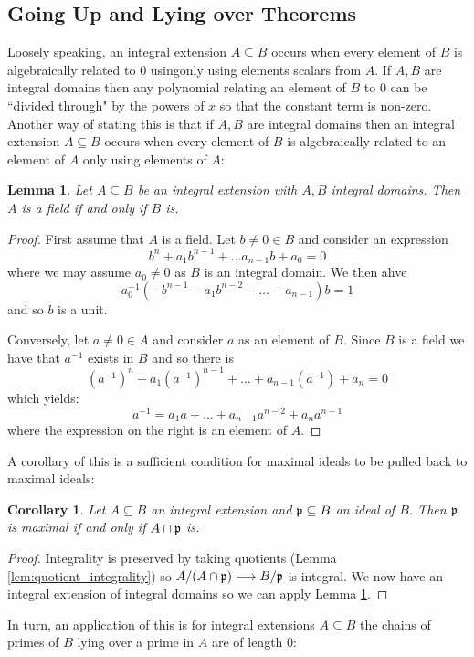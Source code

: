 \documentclass[12pt]{article}
\theoremstyle{plain}
\newtheorem{lemma}[thm]{Lemma}
\newtheorem{cor}[thm]{Corollary}
\theoremstyle{definition}
\newcommand{\lto}{\longrightarrow}
\begin{document}
	\subsection{Going Up and Lying over Theorems}
	Loosely speaking, an integral extension $A \subseteq B$ occurs when every element of $B$ is algebraically related to $0$ usingonly using elements scalars from $A$. If $A,B$ are integral domains then any polynomial relating an element of $B$ to $0$ can be ``divided through" by the powers of $x$ so that the constant term is non-zero. Another way of stating this is that if $A,B$ are integral domains then an integral extension $A \subseteq B$ occurs when every element of $B$ is algebraically related to an element of $A$ only using elements of $A$:
	\begin{lemma}
		\label{lem:integral_ext_fields}
		Let $A \subseteq B$ be an integral extension with $A,B$ integral domains. Then $A$ is a field if and only if $B$ is.
	\end{lemma}
	\begin{proof}
		First assume that $A$ is a field. Let $b \neq 0 \in B$ and consider an expression
		\[b^n + a_1b^{n-1} + \hdots a_{n-1}b + a_0 = 0\]
		where we may assume $a_0 \neq 0$ as $B$ is an integral domain. We then ahve
		\[a_0^{-1}(-b^{n-1} - a_1b^{n-2} - \hdots - a_{n-1})b = 1\]
		and so $b$ is a unit.
		
		Conversely, let $a \neq 0\in A$ and consider $a$ as an element of $B$. Since $B$ is a field we have that $a^{-1}$ exists in $B$ and so there is
		\[(a^{-1})^n + a_{1}(a^{-1})^{n-1} + \hdots + a_{n-1}(a^{-1}) + a_n = 0\]
		which yields:
		\[a^{-1} = a_1a + \hdots + a_{n-1}a^{n-2} + a_na^{n-1}\]
		where the expression on the right is an element of $A$.
	\end{proof}
	A corollary of this is a sufficient condition for maximal ideals to be pulled back to maximal ideals:
	\begin{cor}
		\label{cor:maximality_preserved_integrality}
		Let $A \subseteq B$ an integral extension and $\frak{p} \subseteq B$ an ideal of $B$. Then $\frak{p}$ is maximal if and only if $A \cap \frak{p}$ is.
	\end{cor}
	\begin{proof}
		Integrality is preserved by taking quotients (Lemma \ref{lem:quotient_integrality}) so $A/(A \cap \frak{p}) \lto B/\frak{p}$ is integral. We now have an integral extension of integral domains so we can apply Lemma \ref{lem:integral_ext_fields}.
	\end{proof}
	In turn, an application of this is for integral extensions $A \subseteq B$ the chains of primes of $B$ lying over a prime in $A$ are of length $0$:
\end{document}
